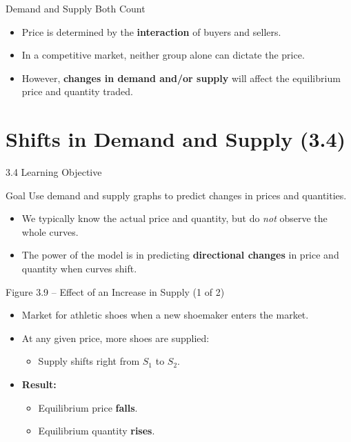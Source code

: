 \documentclass[aspectratio=169]{beamer}
\begin{document}
\begin{frame}{Demand and Supply Both Count}
\transfade
\begin{itemize}
  \item Price is determined by the \textbf{interaction} of buyers and sellers.
  \item In a competitive market, neither group alone can dictate the price.
  \item However, \textbf{changes in demand and/or supply} will affect the equilibrium price and quantity traded.
\end{itemize}
\end{frame}

\section{Shifts in Demand and Supply (3.4)}

\begin{frame}{3.4 Learning Objective}
\transfade
\begin{block}{Goal}
Use demand and supply graphs to predict changes in prices and quantities.
\end{block}
\begin{itemize}
  \item We typically know the actual price and quantity, but do \emph{not} observe the whole curves.
  \item The power of the model is in predicting \textbf{directional changes} in price and quantity when curves shift.
\end{itemize}
\end{frame}

\begin{frame}{Figure 3.9 -- Effect of an Increase in Supply (1 of 2)}
\transfade
\begin{itemize}
  \item Market for athletic shoes when a new shoemaker enters the market.
  \item At any given price, more shoes are supplied:
  \begin{itemize}
    \item Supply shifts right from \(S_1\) to \(S_2\).
  \end{itemize}
  \item \textbf{Result:}
  \begin{itemize}
    \item Equilibrium price \textbf{falls}.
    \item Equilibrium quantity \textbf{rises}.
  \end{itemize}
\end{itemize}
\end{frame}
\end{document}
